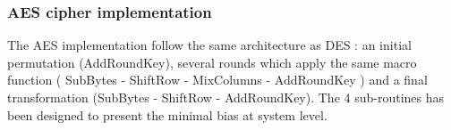 \subsubsection{ AES cipher implementation }

The AES implementation follow the same architecture as DES : an initial permutation (AddRoundKey), several rounds which apply the same macro function ( SubBytes - ShiftRow - MixColumns - AddRoundKey ) and a final transformation (SubBytes - ShiftRow - AddRoundKey). The 4 sub-routines has been designed to present the minimal bias at system level.













